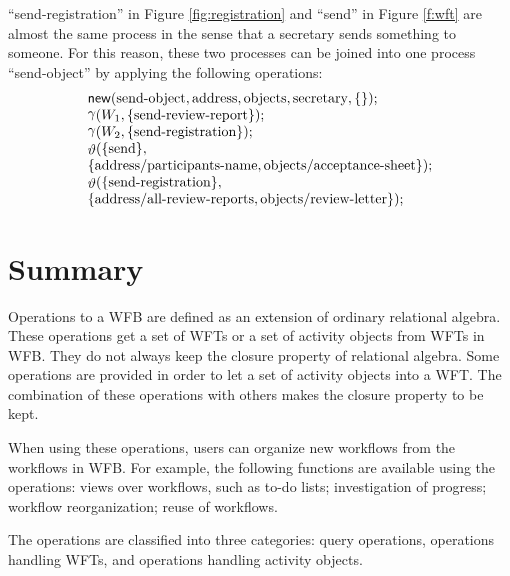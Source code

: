 ``send-registration'' in Figure \ref{fig:registration} and
``send'' in Figure \ref{f:wft} are almost the same process
in the sense that a secretary sends something to someone.  For this
reason, these two processes can be joined into one process
``send-object'' by applying the following operations: 
\[
 \begin{array}{l}
 {\sf new}(\mbox{send-object}, \mbox{address}, \mbox{objects},
  \mbox{secretary}, \{\});\\
 \mathop{\gamma}(W_1, \{\mbox{send-review-report}\});\\
 \mathop{\gamma}(W_2, \{\mbox{send-registration}\});\\
 \mathop{\vartheta}(\{\mbox{send}\},\\
  \{\mbox{address/participants-name}, \mbox{objects/acceptance-sheet}\});\\
 \mathop{\vartheta}(\{\mbox{send-registration}\},\\
 \{\mbox{address/all-review-reports}, \mbox{objects/review-letter}\});
 \end{array}
\]

\section{Summary}

Operations to a WFB are defined as an extension of ordinary relational
algebra.  These operations get a set of WFTs or a set of activity
objects from WFTs in WFB\@.  They do not always keep the closure property
of relational algebra.  Some operations are provided in order to let a
set of activity objects into a WFT\@.  The combination of these operations
with others makes the closure property to be kept.

When using these operations, users can organize new workflows from the
workflows in WFB\@.  For example, the following functions are available
using the operations: views over workflows, such as to-do lists;
investigation of progress; workflow reorganization; reuse of workflows.

The operations are classified into three categories: query operations,
operations handling WFTs, and operations handling activity objects.
